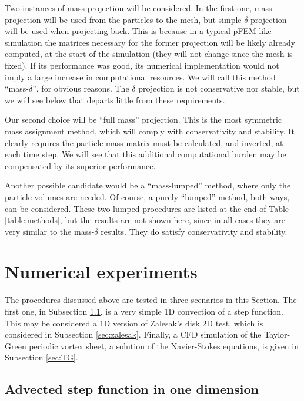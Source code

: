 \documentclass{ws-ijcm}
\begin{document}
Two instances of mass projection will be considered. In the first one,
mass projection will be used from the particles to the mesh, but
simple $\delta$ projection will be used when projecting back. This is
because in a typical pFEM-like simulation the matrices necessary for
the former projection will be likely already computed, at the start of
the simulation (they will not change since the mesh is fixed).  If its
performance was good, its numerical implementation would not imply a
large increase in computational resources. We will call this method
``mass-$\delta$'', for obvious reasons. The $\delta$ projection
is not conservative nor stable, but we will see below that
departs little from these requirements.

Our second choice will be ``full mass'' projection. This is the
most symmetric mass assignment method, which will comply with conservativity
and stability. It clearly requires the particle mass matrix must be
calculated, and inverted, at each time step. We will see that this additional
computational burden may be compensated by its superior performance.

Another possible candidate would be a
``mass-lumped'' method, where only the particle volumes are needed.
Of course, a purely ``lumped'' method, both-ways, can be
considered. These two lumped procedures are listed at the end of Table
\ref{table:methods}, but the results are not shown here, since in all
cases they are very similar to the mass-$\delta$ results. They
do satisfy conservativity and stability.


\section{Numerical experiments}
\label{sec:results}


The procedures discussed above are tested in three scenarios in this
Section. The first one, in Subsection \ref{sec:1D}, is a very simple
1D convection of a step function. This may be considered a 1D version
of Zalesak's disk 2D test, which is considered in Subsection
\ref{sec:zalesak}. Finally, a CFD simulation of the Taylor-Green
periodic vortex sheet, a solution of the Navier-Stokes equations, is
given in Subsection \ref{sec:TG}.


\subsection{Advected step function in one dimension}
\label{sec:1D}
\end{document}
